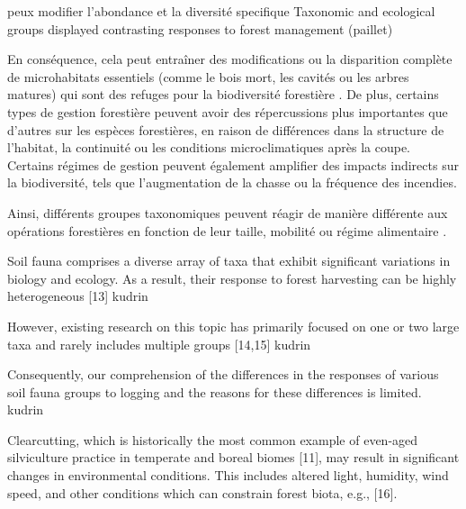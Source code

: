 

peux modifier l'abondance et la diversité specifique
Taxonomic and ecological groups displayed contrasting responses to forest management (paillet)

En conséquence, cela peut entraîner des modifications ou la disparition complète de microhabitats essentiels (comme le bois mort, les cavités ou les arbres matures) qui sont des refuges pour la biodiversité forestière \citep{Paillet2010Biodiversitydifferences}. 
De plus, certains types de gestion forestière peuvent avoir des répercussions plus importantes que d'autres sur les espèces forestières, en raison de différences dans la structure de l'habitat, la continuité ou les conditions microclimatiques après la coupe. 
Certains régimes de gestion peuvent également amplifier des impacts indirects sur la biodiversité, tels que l'augmentation de la chasse ou la fréquence des incendies.

Ainsi, différents groupes taxonomiques peuvent réagir de manière différente aux opérations forestières en fonction de leur taille, mobilité ou régime alimentaire \citep{Barlow2007Quantifyingbiodiversity,Stork2009Vulnerabilityresilience}.


Soil fauna comprises a diverse array of taxa that exhibit significant variations in biology and ecology. As a result, their response to forest harvesting can be highly heterogeneous [13] kudrin

However, existing research on this topic has primarily focused on one or two large taxa and rarely includes multiple groups [14,15] kudrin

Consequently, our comprehension of the differences in the responses of various soil fauna groups to logging and the reasons for these differences is limited. kudrin

Clearcutting, which is historically the most common example of even-aged silviculture practice in temperate and boreal biomes [11], may result in significant changes in environmental conditions. This includes altered light, humidity, wind speed, and other conditions which can constrain forest biota, e.g., [16].

